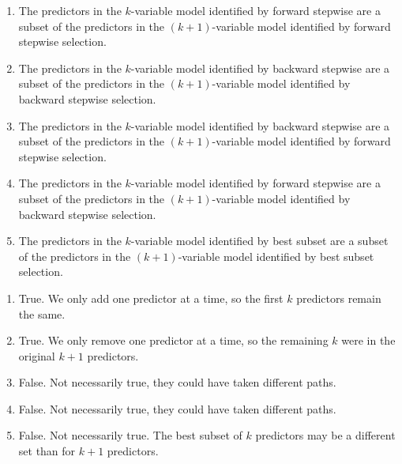 \documentclass{article}
\begin{document}
\begin{probset}
\begin{prob}
\begin{subprobset}
\begin{subprob}
            \begin{enumerate}[label=\roman*.]
                \item The predictors in the $k$-variable model identified by forward stepwise are a subset of the predictors in the $(k + 1)$-variable model identified by forward stepwise selection.
                \item The predictors in the $k$-variable model identified by backward stepwise are a subset of the predictors in the $(k + 1)$-variable model identified by backward stepwise selection.
                \item The predictors in the $k$-variable model identified by backward stepwise are a subset of the predictors in the $(k + 1)$-variable model identified by forward stepwise selection.
                \item The predictors in the $k$-variable model identified by forward stepwise are a subset of the predictors in the $(k + 1)$-variable model identified by backward stepwise selection.
                \item The predictors in the $k$-variable model identified by best subset are a subset of the predictors in the $(k + 1)$-variable model identified by best subset selection.
            \end{enumerate}

            \begin{soln}
                \begin{enumerate}[label=\roman*.]
                    \item True. We only add one predictor at a time, so the first $k$ predictors remain the same.
                    \item True. We only remove one predictor at a time, so the remaining $k$ were in the original $k+1$ predictors.
                    \item False. Not necessarily true, they could have taken different paths.
                    \item False. Not necessarily true, they could have taken different paths.
                    \item False. Not necessarily true. The best subset of $k$ predictors may be a different set than for $k+1$ predictors.
                \end{enumerate}
            \end{soln}
        \end{subprob}
    \end{subprobset}
\end{prob}


\end{probset}
\end{document}

